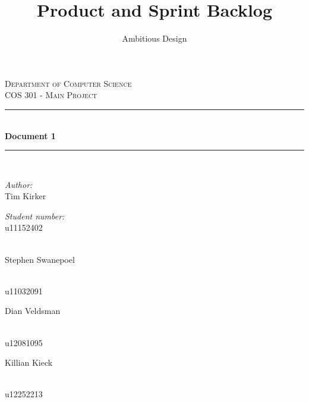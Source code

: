 \documentclass[a4paper,12pt]{report}
\author{Ambitious Design}
\title{Product and Sprint Backlog}
\newcommand{\HRule}{\rule{\linewidth}{0.5mm}}
\begin{document}
\setlength{\parskip}{6pt}

\begin{titlepage}
	
	\begin{center}
		\textsc{\LARGE Department of Computer Science}\\[1.5cm]
		\textsc{\Large COS 301 - Main Project}\\[0.5cm]
		\HRule \\[0.4cm]
		{ \huge \bfseries Document 1}\\[0.4cm]
		\HRule \\[0.4cm]
		\begin{minipage}{0.4\textwidth}
			\begin{flushleft} \large
				\emph{Author:}\\
				Tim {Kirker}
			\end{flushleft}
		\end{minipage}
		\begin{minipage}{0.4\textwidth}
			\begin{flushright} \large
				\emph{Student number:} \\
				u11152402
			\end{flushright}
		\end{minipage}
		\begin{minipage}{0.4\textwidth}
			\begin{flushleft} \large
				\emph{} \\
				Stephen {Swanepoel}
			\end{flushleft}
		\end{minipage}
		\begin{minipage}{0.4\textwidth}
			\begin{flushright} \large
				\emph{} \\
				u11032091
			\end{flushright}
		\end{minipage}
		\begin{minipage}{0.4\textwidth}
			\begin{flushleft} \large
				Dian {Veldsman}
			\end{flushleft}
		\end{minipage}
		\begin{minipage}{0.4\textwidth}
			\begin{flushright} \large
				\emph{} \\
				u12081095
			\end{flushright}
		\end{minipage}
		\begin{minipage}{0.4\textwidth}
			\begin{flushleft} \large
				Killian {Kieck}
			\end{flushleft}
		\end{minipage}
		\begin{minipage}{0.4\textwidth}
			\begin{flushright} \large
				\emph{} \\
				u12252213
			\end{flushright}
		\end{minipage}
		

\end{center}
\end{titlepage}
\end{document}

